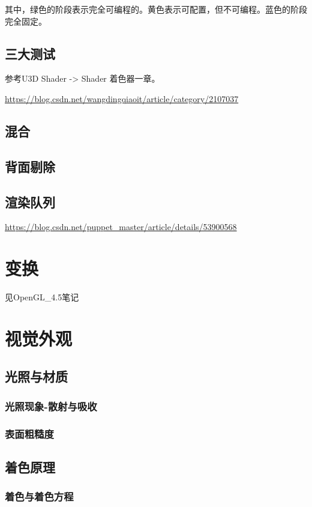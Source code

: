 \documentclass[UTF8,a4paper,12pt]{ctexbook}
\begin{document}
		其中，\color{olive}绿色的阶段表示完全可编程的。\color{yellow}黄色表示可配置，但不可编程。\color{blue}蓝色的阶段完全固定。\color{black}
		
	\section{三大测试}
		参考U3D Shader -> Shader 着色器一章。
		
		\url{https://blog.csdn.net/wangdingqiaoit/article/category/2107037}
	
	\section{混合}
	
	
	\section{背面剔除}
	
	
	\section{渲染队列}
		\url{https://blog.csdn.net/puppet_master/article/details/53900568}
		
		
\chapter{变换}
	见OpenGL\_4.5笔记


\chapter{视觉外观}
	\section{光照与材质}
		\subsection{光照现象-散射与吸收}
		
		\subsection{表面粗糙度}
		
	\section{着色原理}
		\subsection{着色与着色方程}
		
\end{document}
